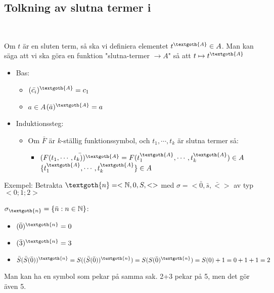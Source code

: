 \subsection{Tolkning av slutna termer i }\hfill\\
\par\bigskip
\noindent Om $t$ är en sluten term, så ska vi definiera elementet $t^{\textgoth{A}}\in A$. Man kan säga att vi ska göra en funktion "slutna-termer $\to A$" så att $t\mapsto t^{\textgoth{A}}$ 
\par\bigskip
\begin{itemize}
  \item Bas:
    \begin{itemize}
      \item $(\bar{c_i})^{\textgoth{A}} = c_1$
      \item $a\in A$\qquad $(\bar{a})^{\textgoth{A}} = a$
    \end{itemize}
  \item Induktionssteg:
    \begin{itemize}
      \item Om $\bar{F}$ är $k$-ställig funktionssymbol, och $t_1,\cdots,t_k$ är slutna termer så:
        \begin{itemize}
          \item $\bar{(F(t_1,\cdots,t_k))^{\textgoth{A}}}= F(t_1^{\textgoth{A}},\cdots,t_k^{\textgoth{A}})\in A$\qquad $\{t_1^{\textgoth{A}},\cdots, t_k^{\textgoth{A}}\}\in A$
        \end{itemize}
    \end{itemize}
\end{itemize}
\par\bigskip
\noindent Exempel: Betrakta $\textgoth{n} = <\N,0,S,<>$ med $\sigma = <\bar{0}, \bar{s}, \bar{<}>$ av typ $<0;1;2>$\par
\noindent $\sigma_{\textgoth{n}} = \{\bar{n}:n\in\N\}$:
\par\bigskip
\begin{itemize}
  \item $(\bar{0})^{\textgoth{n}}=0$
  \item $(\bar{3})^{\textgoth{n}}=3$
  \item $\bar{S}(\bar{S}(\bar{0}))^{\textgoth{n}} = S((\bar{S}(\bar{0}))^{\textgoth{n}}) = S(S(\bar{0})^{\textgoth{n}}) = S(0)+1 = 0+1+1 = 2$
\end{itemize}
\par\bigskip
\noindent Man kan ha en symbol som pekar på samma sak. 2+3 pekar på 5, men det gör även 5.
\par\bigskip
